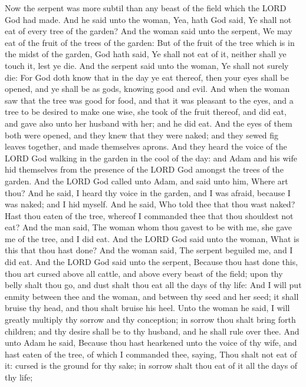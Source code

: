 \begin{biblechapter} %
\verse Now the serpent was more subtil than any beast of the field which the LORD God had made. And he said unto the woman, Yea, hath God said, Ye shall not eat of every tree of the garden?
\verse And the woman said unto the serpent, We may eat of the fruit of the trees of the garden:
\verse But of the fruit of the tree which is in the midst of the garden, God hath said, Ye shall not eat of it, neither shall ye touch it, lest ye die.
\verse And the serpent said unto the woman, Ye shall not surely die:
\verse For God doth know that in the day ye eat thereof, then your eyes shall be opened, and ye shall be as gods, knowing good and evil.
\verse And when the woman saw that the tree was good for food, and that it was pleasant to the eyes, and a tree to be desired to make one wise, she took of the fruit thereof, and did eat, and gave also unto her husband with her; and he did eat.
\verse And the eyes of them both were opened, and they knew that they were naked; and they sewed fig leaves together, and made themselves aprons.
\verse And they heard the voice of the LORD God walking in the garden in the cool of the day: and Adam and his wife hid themselves from the presence of the LORD God amongst the trees of the garden.
\verse And the LORD God called unto Adam, and said unto him, Where art thou?
\verse And he said, I heard thy voice in the garden, and I was afraid, because I was naked; and I hid myself.
\verse And he said, Who told thee that thou wast naked? Hast thou eaten of the tree, whereof I commanded thee that thou shouldest not eat?
\verse And the man said, The woman whom thou gavest to be with me, she gave me of the tree, and I did eat.
\verse And the LORD God said unto the woman, What is this that thou hast done? And the woman said, The serpent beguiled me, and I did eat.
\verse And the LORD God said unto the serpent, Because thou hast done this, thou art cursed above all cattle, and above every beast of the field; upon thy belly shalt thou go, and dust shalt thou eat all the days of thy life:
\verse And I will put enmity between thee and the woman, and between thy seed and her seed; it shall bruise thy head, and thou shalt bruise his heel.
\verse Unto the woman he said, I will greatly multiply thy sorrow and thy conception; in sorrow thou shalt bring forth children; and thy desire shall be to thy husband, and he shall rule over thee.
\verse And unto Adam he said, Because thou hast hearkened unto the voice of thy wife, and hast eaten of the tree, of which I commanded thee, saying, Thou shalt not eat of it: cursed is the ground for thy sake; in sorrow shalt thou eat of it all the days of thy life;

\end{biblechapter}
